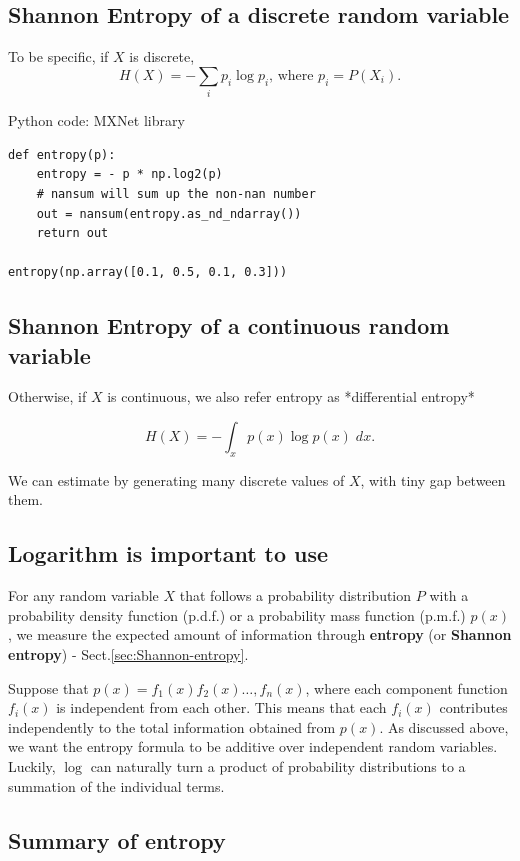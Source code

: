 \subsection{Shannon Entropy of a discrete random variable}

To be specific, if $X$ is discrete, $$H(X) = - \sum_i p_i \log p_i \text{, where } p_i = P(X_i).$$ 


Python code: MXNet library
\begin{lstlisting}
def entropy(p):
    entropy = - p * np.log2(p)
    # nansum will sum up the non-nan number
    out = nansum(entropy.as_nd_ndarray())
    return out

entropy(np.array([0.1, 0.5, 0.1, 0.3]))
\end{lstlisting}

\subsection{Shannon Entropy of a continuous random variable}

Otherwise, if $X$ is continuous, we also refer entropy as *differential entropy* 

$$H(X) = - \int_x p(x) \log p(x) \; dx.$$

We can estimate by generating many discrete values of $X$, with tiny gap between them.

\subsection{Logarithm is important to use}


For any random variable $X$ that follows a probability distribution $P$ with a
probability density function (p.d.f.) or a probability mass function (p.m.f.)
$p(x)$, we measure the expected amount of information through {\bf entropy} (or
{\bf Shannon entropy}) - Sect.\ref{sec:Shannon-entropy}.

Suppose that $p(x) = f_1(x) f_2(x) \ldots, f_n(x)$, where each component
function $f_i(x)$ is independent from each other. This means that each $f_i(x)$
contributes independently to the total information obtained from $p(x)$. As
discussed above, we want the entropy formula to be additive over independent
random variables. Luckily, $\log$ can naturally turn a product of probability
distributions to a summation of the individual terms.


\subsection{Summary of entropy}

